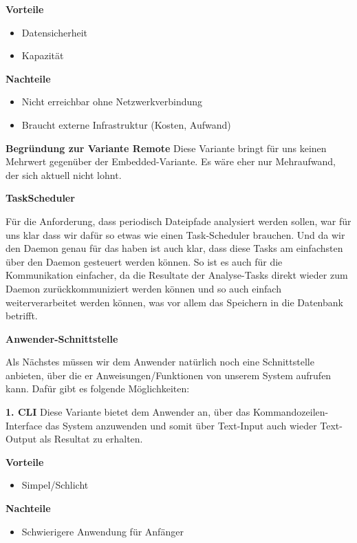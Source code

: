 \documentclass[a4paper,12pt]{report}
\begin{document}
    \textbf{Vorteile}
    \begin{itemize}
        \item Datensicherheit
        \item Kapazität
    \end{itemize}

    \textbf{Nachteile}
    \begin{itemize}
        \item Nicht erreichbar ohne Netzwerkverbindung
        \item Braucht externe Infrastruktur (Kosten, Aufwand)
    \end{itemize}

    \textbf{Begründung zur Variante Remote} Diese Variante bringt für uns keinen Mehrwert gegenüber der Embedded-Variante.
    Es wäre eher nur Mehraufwand, der sich aktuell nicht lohnt.

        {\large\bfseries TaskScheduler}

    Für die Anforderung, dass periodisch Dateipfade analysiert werden sollen, war für uns klar dass wir dafür so etwas wie einen
    Task-Scheduler brauchen.
    Und da wir den Daemon genau für das haben ist auch klar, dass diese Tasks am einfachsten über den Daemon gesteuert werden können.
    So ist es auch für die Kommunikation einfacher, da die Resultate der Analyse-Tasks direkt wieder zum Daemon zurückkommuniziert werden können
    und so auch einfach weiterverarbeitet werden können, was vor allem das Speichern in die Datenbank betrifft.

        {\large\bfseries Anwender-Schnittstelle}

    Als Nächstes müssen wir dem Anwender natürlich noch eine Schnittstelle anbieten, über die er Anweisungen/Funktionen von unserem System
    aufrufen kann.
    Dafür gibt es folgende Möglichkeiten:

    \textbf{1. CLI}
    Diese Variante bietet dem Anwender an, über das Kommandozeilen-Interface das System anzuwenden und somit über
    Text-Input auch wieder Text-Output als Resultat zu erhalten.

    \textbf{Vorteile}
    \begin{itemize}
        \item Simpel/Schlicht
    \end{itemize}

    \textbf{Nachteile}
    \begin{itemize}
        \item Schwierigere Anwendung für Anfänger
    \end{itemize}
\end{document}

